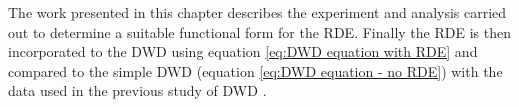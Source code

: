 The work presented in this chapter describes the experiment and analysis carried out to determine a suitable functional form for the RDE.
Finally the RDE is then incorporated to the DWD using equation \ref{eq:DWD equation with RDE} and compared to the simple DWD (equation \ref{eq:DWD equation - no RDE}) with the data used in the previous study of DWD \cite{zeldin2013dwd}.
